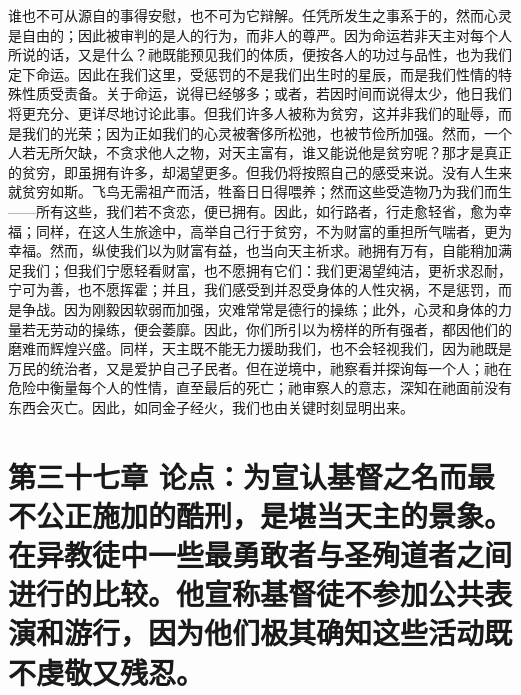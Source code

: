 谁也不可从源自的事得安慰，也不可为它辩解。任凭所发生之事系于的，然而心灵是自由的；因此被审判的是人的行为，而非人的尊严。因为命运若非天主对每个人所说的话，又是什么？祂既能预见我们的体质，便按各人的功过与品性，也为我们定下命运。因此在我们这里，受惩罚的不是我们出生时的星辰，而是我们性情的特殊性质受责备。关于命运，说得已经够多；或者，若因时间而说得太少，他日我们将更充分、更详尽地讨论此事。但我们许多人被称为贫穷，这并非我们的耻辱，而是我们的光荣；因为正如我们的心灵被奢侈所松弛，也被节俭所加强。然而，一个人若无所欠缺，不贪求他人之物，对天主富有，谁又能说他是贫穷呢？那才是真正的贫穷，即虽拥有许多，却渴望更多。但我仍将按照自己的感受来说。没有人生来就贫穷如斯。飞鸟无需祖产而活，牲畜日日得喂养；然而这些受造物乃为我们而生——所有这些，我们若不贪恋，便已拥有。因此，如行路者，行走愈轻省，愈为幸福；同样，在这人生旅途中，高举自己行于贫穷，不为财富的重担所气喘者，更为幸福。然而，纵使我们以为财富有益，也当向天主祈求。祂拥有万有，自能稍加满足我们；但我们宁愿轻看财富，也不愿拥有它们：我们更渴望纯洁，更祈求忍耐，宁可为善，也不愿挥霍；并且，我们感受到并忍受身体的人性灾祸，不是惩罚，而是争战。因为刚毅因软弱而加强，灾难常常是德行的操练；此外，心灵和身体的力量若无劳动的操练，便会萎靡。因此，你们所引以为榜样的所有强者，都因他们的磨难而辉煌兴盛。同样，天主既不能无力援助我们，也不会轻视我们，因为祂既是万民的统治者，又是爱护自己子民者。但在逆境中，祂察看并探询每一个人；祂在危险中衡量每个人的性情，直至最后的死亡；祂审察人的意志，深知在祂面前没有东西会灭亡。因此，如同金子经火，我们也由关键时刻显明出来。\par


\section{第三十七章 论点：为宣认基督之名而最不公正施加的酷刑，是堪当天主的景象。在异教徒中一些最勇敢者与圣殉道者之间进行的比较。他宣称基督徒不参加公共表演和游行，因为他们极其确知这些活动既不虔敬又残忍。}

